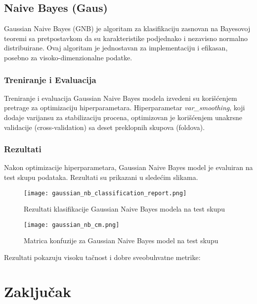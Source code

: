 \documentclass[a4paper,12pt]{article}
\begin{document}
\clearpage

\subsection{Naive Bayes (Gaus)}
Gaussian Naive Bayes (GNB) je algoritam za klasifikaciju zasnovan na Bayesovoj teoremi sa pretpostavkom da su karakteristike podjednako i nezavisno normalno distribuirane. Ovaj algoritam je jednostavan za implementaciju i efikasan, posebno za visoko-dimenzionalne podatke.

\subsubsection{Treniranje i Evaluacija}
Treniranje i evaluacija Gaussian Naive Bayes modela izvedeni su korišćenjem pretrage za optimizaciju hiperparametara. Hiperparametar \textit{var\_smoothing}, koji dodaje varijansu za stabilizaciju procena, optimizovan je korišćenjem unakrsne validacije (cross-validation) sa deset preklopnih skupova (foldova).

\subsubsection{Rezultati}
Nakon optimizacije hiperparametara, Gaussian Naive Bayes model je evaluiran na test skupu podataka. Rezultati su prikazani u sledećim slikama.

\begin{figure}[h!]
\centering
\texttt{[image: gaussian\_nb\_classification\_report.png]}
\caption{Rezultati klasifikacije Gaussian Naive Bayes modela na test skupu}
\label{fig:gaussian_nb_classification_report}
\end{figure}

\begin{figure}[h!]
\centering
\texttt{[image: gaussian\_nb\_cm.png]}
\caption{Matrica konfuzije za Gaussian Naive Bayes model na test skupu}
\label{fig:gaussian_nb_cm}
\end{figure}

Rezultati pokazuju visoku tačnost i dobre sveobuhvatne metrike:


\section{Zaključak}


\begin{thebibliography}{9}
\end{thebibliography}
\end{document}
